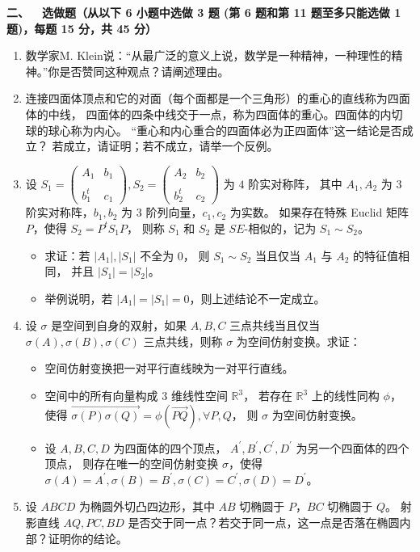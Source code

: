 \textbf{二、\ \ 选做题（从以下 6 小题中选做 3 题 
(第 6 题和第 11 题至多只能选做 1 题)，每题 15 分，共 45 分）}
\begin{enumerate}
\item 数学家M. Klein说：``从最广泛的意义上说，数学是一种精神，一种理性的精神。''你是否赞同这种观点？请阐述理由。

\item 连接四面体顶点和它的对面（每个面都是一个三角形）的重心的直线称为四面体的中线，
四面体的四条中线交于一点，称为四面体的重心。四面体的内切球的球心称为内心。
``重心和内心重合的四面体必为正四面体''这一结论是否成立？
若成立，请证明；若不成立，请举一个反例。

\item 设 $S_{1}=\begin{pmatrix}A_{1} & b_{1} \\ \\ b_{1}^{t} & c_{1}\end{pmatrix}, 
S_{2}=\begin{pmatrix}A_{2} & b_{2} \\ \\ b_{2}^{t} & c_{2}\end{pmatrix}$ 为 $4$ 阶实对称阵，
其中 $A_{1}, A_{2}$ 为 $3$ 阶实对称阵，$b_{1}, b_{2}$ 为 $3$ 阶列向量，$c_{1}, c_{2}$ 为实数。
如果存在特殊 Euclid 矩阵 $P$，使得 $S_{2}=P^{t} S_{1} P$，
则称 $S_{1}$ 和 $S_{2}$ 是 $SE$-相似的，记为 $S_{1} \sim S_{2}$。
\begin{itemize}
\item[(a)] 求证：若 $|A_{1}|,|S_{1}|$ 不全为 $0$，
则 $S_{1} \sim S_{2}$ 当且仅当 $A_{1}$ 与 $A_{2}$ 的特征值相同，
并且 $|S_{1}|=|S_{2}|$。
\item[(b)] 举例说明，若 $|A_{1}|=|S_{1}|=0$，则上述结论不一定成立。
\end{itemize}
\item 设 $\sigma$ 是空间到自身的双射，如果 $A, B, C$ 三点共线当且仅当 
$\sigma(A), \sigma(B), \sigma(C)$ 三点共线，则称 $\sigma$ 为空间仿射变换。求证：
\begin{itemize}
\item[(a)] 空间仿射变换把一对平行直线映为一对平行直线。
\item[(b)] 空间中的所有向量构成 $3$ 维线性空间 $\mathbb{R}^{3}$，
若存在 $\mathbb{R}^{3}$ 上的线性同构 $\phi$，
使得 $\overrightarrow{\sigma(P) \sigma(Q)}=\phi(\overrightarrow{PQ}), \forall P, Q$，
则 $\sigma$ 为空间仿射变换。
\item[(c)] 设 $A, B, C, D$ 为四面体的四个顶点，
$A^{\prime}, B^{\prime}, C^{\prime}, D^{\prime}$ 为另一个四面体的四个顶点，
则存在唯一的空间仿射变换 $\sigma$，使得 $\sigma(A)=A^{\prime}, \sigma(B)=B^{\prime}, \sigma(C)=C^{\prime}, \sigma(D)=D^{\prime}$。
\end{itemize}
\item 设 $ABCD$ 为椭圆外切凸四边形，其中 $AB$ 切椭圆于 $P$，$BC$ 切椭圆于 $Q$。
射影直线 $AQ, PC, BD$ 是否交于同一点？若交于同一点，这一点是否落在椭圆内部？证明你的结论。


\end{enumerate}
